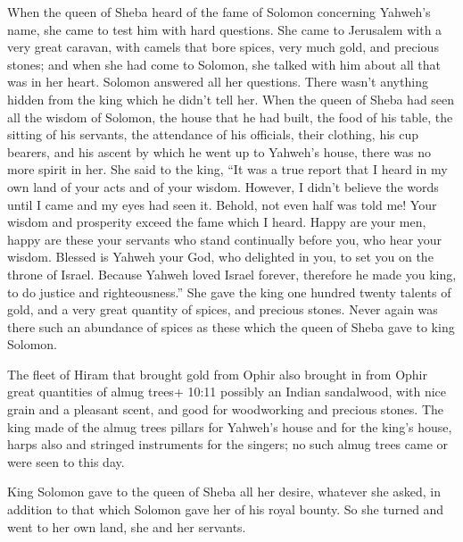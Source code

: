  When the queen of Sheba heard of the fame of Solomon
concerning Yahweh's name, she came to test him with hard questions.
 She came to Jerusalem with a very great caravan, with
camels that bore spices, very much gold, and precious stones; and when
she had come to Solomon, she talked with him about all that was in her
heart.  Solomon answered all her questions. There wasn't
anything hidden from the king which he didn't tell her. 
When the queen of Sheba had seen all the wisdom of Solomon, the house
that he had built,  the food of his table, the sitting of
his servants, the attendance of his officials, their clothing, his cup
bearers, and his ascent by which he went up to Yahweh's house, there was
no more spirit in her.  She said to the king, ``It was a
true report that I heard in my own land of your acts and of your wisdom.
 However, I didn't believe the words until I came and my
eyes had seen it. Behold, not even half was told me! Your wisdom and
prosperity exceed the fame which I heard.  Happy are your
men, happy are these your servants who stand continually before you, who
hear your wisdom.  Blessed is Yahweh your God, who delighted
in you, to set you on the throne of Israel. Because Yahweh loved Israel
forever, therefore he made you king, to do justice and righteousness.''
 She gave the king one hundred twenty talents of gold, and
a very great quantity of spices, and precious stones. Never again was
there such an abundance of spices as these which the queen of Sheba gave
to king Solomon.

 The fleet of Hiram that brought gold from Ophir also
brought in from Ophir great quantities of almug trees+ 10:11 possibly an
Indian sandalwood, with nice grain and a pleasant scent, and good for
woodworking and precious stones.  The king made of the
almug trees pillars for Yahweh's house and for the king's house, harps
also and stringed instruments for the singers; no such almug trees came
or were seen to this day.

 King Solomon gave to the queen of Sheba all her desire,
whatever she asked, in addition to that which Solomon gave her of his
royal bounty. So she turned and went to her own land, she and her
servants.

